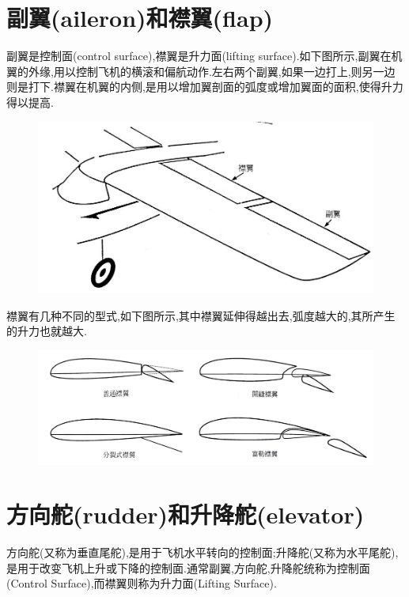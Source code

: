 \documentclass[9pt, oneside]{book}
\begin{document}
\section{副翼(aileron)和襟翼(flap)}

副翼是控制面(control surface),襟翼是升力面(lifting surface).如下图所示,副翼在机翼的外缘,用以控制飞机的横滚和偏航动作.左右两个副翼,如果一边打上,则另一边则是打下.襟翼在机翼的内侧,是用以增加翼剖面的弧度或增加翼面的面积,使得升力得以提高.
\begin{figure}[H]
    \centering
    \includegraphics[width=0.6\linewidth]{image/2-9.jpg}
\end{figure}

襟翼有几种不同的型式,如下图所示,其中襟翼延伸得越出去,弧度越大的,其所产生的升力也就越大.
\begin{figure}[H]
    \centering
    \includegraphics[width=0.8\linewidth]{image/2-10.jpg}
\end{figure}

\section{方向舵(rudder)和升降舵(elevator)}

方向舵(又称为垂直尾舵),是用于飞机水平转向的控制面;升降舵(又称为水平尾舵),是用于改变飞机上升或下降的控制面.通常副翼,方向舵,升降舵统称为控制面(Control Surface),而襟翼则称为升力面(Lifting Surface).
\end{document}
